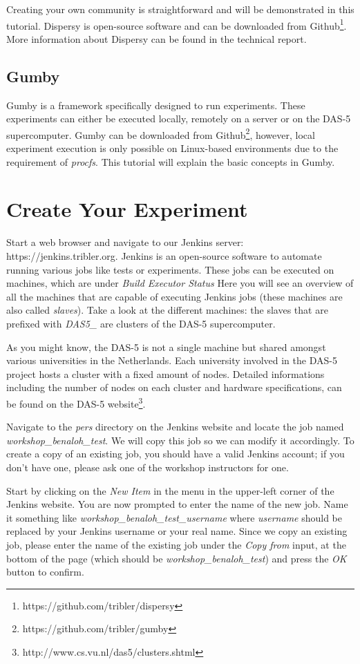 \documentclass{article}
\begin{document}
Creating your own community is straightforward and will be demonstrated in this tutorial.
Dispersy is open-source software and can be downloaded from Github\footnote{https://github.com/tribler/dispersy}.
More information about Dispersy can be found in the technical report\cite{zeilemaker2013dispersy}.

\subsection{Gumby}
Gumby is a framework specifically designed to run experiments.
These experiments can either be executed locally, remotely on a server or on the DAS-5 supercomputer.
Gumby can be downloaded from Github\footnote{https://github.com/tribler/gumby}, however, local experiment execution is only possible on Linux-based environments due to the requirement of \emph{procfs}.
This tutorial will explain the basic concepts in Gumby.

\section{Create Your Experiment}
Start a web browser and navigate to our Jenkins server: https://jenkins.tribler.org.
Jenkins is an open-source software to automate running various jobs like tests or experiments.
These jobs can be executed on machines, which are under \emph{Build Executor Status} 
Here you will see an overview of all the machines that are capable of executing Jenkins jobs (these machines are also called \emph{slaves}).
Take a look at the different machines: the slaves that are prefixed with \emph{DAS5\_} are clusters of the DAS-5 supercomputer.

As you might know, the DAS-5 is not a single machine but shared amongst various universities in the Netherlands.
Each university involved in the DAS-5 project hosts a cluster with a fixed amount of nodes.
Detailed informations including the number of nodes on each cluster and hardware specifications, can be found on the DAS-5 website\footnote{http://www.cs.vu.nl/das5/clusters.shtml}.

Navigate to the \emph{pers} directory on the Jenkins website and locate the job named \emph{workshop\_benaloh\_test}.
We will copy this job so we can modify it accordingly.
To create a copy of an existing job, you should have a valid Jenkins account; if you don't have one, please ask one of the workshop instructors for one.

Start by clicking on the \emph{New Item} in the menu in the upper-left corner of the Jenkins website.
You are now prompted to enter the name of the new job.
Name it something like \emph{workshop\_benaloh\_test\_username} where \emph{username} should be replaced by your Jenkins username or your real name.
Since we copy an existing job, please enter the name of the existing job under the \emph{Copy from} input, at the bottom of the page (which should be \emph{workshop\_benaloh\_test}) and press the \emph{OK} button to confirm.
\end{document}
